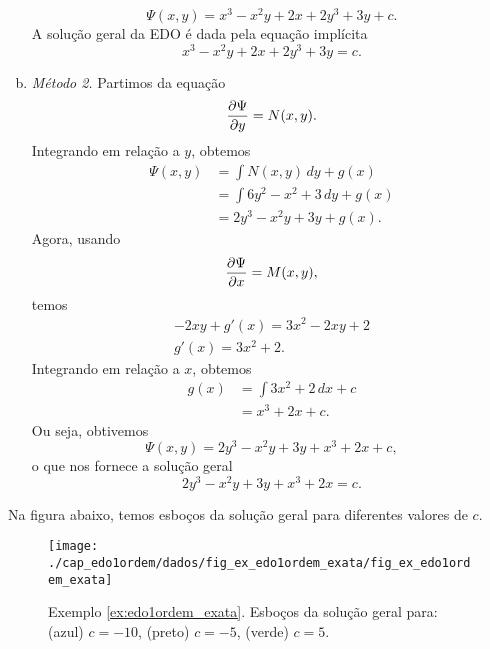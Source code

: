 \begin{ex}
\begin{enumerate}[a)]
\begin{equation}
      \Psi(x,y) = x^3 - x^2y + 2x + 2y^3 + 3y + c.
    \end{equation}
    A solução geral da EDO é dada pela equação implícita
    \begin{equation}
      x^3 - x^2y + 2x + 2y^3 + 3y = c.
    \end{equation}
  \item \emph{Método 2.}
    Partimos da equação
    \begin{equation}
      \frac{\partial\Psi}{\partial y} = N(x,y).
    \end{equation}
    Integrando em relação a $y$, obtemos
    \begin{align}
      \Psi(x,y) &= \int N(x,y)\,dy + g(x)\\
      &= \int 6y^2 - x^2 + 3\,dy + g(x) \\
      &= 2y^3 - x^2y + 3y + g(x).
    \end{align}
    Agora, usando
    \begin{equation}
      \frac{\partial\Psi}{\partial x} = M(x,y),
    \end{equation}
    temos
    \begin{gather}
      -2xy + g'(x) = 3x^2 - 2xy + 2 \\
      g'(x) = 3x^2 + 2.
    \end{gather}
    Integrando em relação a $x$, obtemos
    \begin{align}
      g(x) &= \int 3x^2 + 2\,dx + c \\
      &= x^3 + 2x + c.
    \end{align}
    Ou seja, obtivemos
    \begin{equation}
      \Psi(x,y) = 2y^3 - x^2y + 3y + x^3 + 2x + c,
    \end{equation}
    o que nos fornece a solução geral
    \begin{equation}
      2y^3 - x^2y + 3y + x^3 + 2x = c.
    \end{equation}
  \end{enumerate}

  Na figura abaixo, temos esboços da solução geral para diferentes valores de $c$.

  \begin{figure}[H]
    \centering
    \texttt{[image: ./cap\_edo1ordem/dados/fig\_ex\_edo1ordem\_exata/fig\_ex\_edo1ordem\_exata]}
    \caption{Exemplo \ref{ex:edo1ordem_exata}. Esboços da solução geral para: (azul) $c=-10$, (preto) $c=-5$, (verde) $c=5$.}
    \label{fig:ex_edo1ordem_exata}
  \end{figure}
  

\end{ex}
